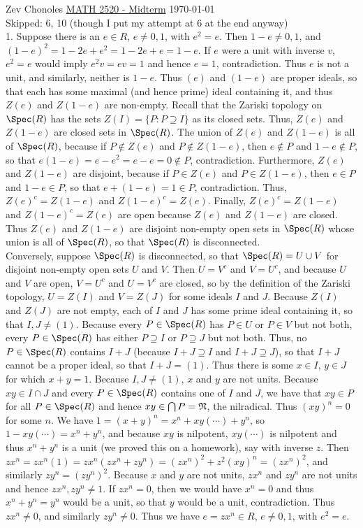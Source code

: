 \documentclass[11pt]{article}
\begin{document}
Zev Chonoles \hfill 
\underline{MATH 2520 - Midterm} \hfill \today\\

Skipped: 6, 10 (though I put my attempt at 6 at the end anyway)\\

\num{1.} Suppose there is an $e\in R$, $e\neq0,1$, with $e^2=e$. Then $1-e\neq0,1$, and $(1-e)^2=1-2e+e^2=1-2e+e=1-e$. If $e$ were a unit with inverse $v$, $e^2=e$ would imply $e^2v=ev=1$ and hence $e=1$, contradiction. Thus $e$ is not a unit, and similarly, neither is $1-e$. Thus $(e)$ and $(1-e)$ are proper ideals, so that each has some maximal (and hence prime) ideal containing it, and thus $Z(e)$ and $Z(1-e)$ are non-empty. Recall that the Zariski topology on $\Spec(R)$ has the sets $Z(I)=\{P:P\supseteq I\}$ as its closed sets. Thus, $Z(e)$ and $Z(1-e)$ are closed sets in $\Spec(R)$. The union of $Z(e)$ and $Z(1-e)$ is all of $\Spec(R)$, because if $P\notin Z(e)$ and $P\notin Z(1-e)$, then $e\notin P$ and $1-e\notin P$, so that $e(1-e)=e-e^2=e-e=0\notin P$, contradiction. Furthermore, $Z(e)$ and $Z(1-e)$ are disjoint, because if $P\in Z(e)$ and $P\in Z(1-e)$, then $e\in P$ and $1-e\in P$, so that $e+(1-e)=1\in P$, contradiction. Thus, $Z(e)^c=Z(1-e)$ and $Z(1-e)^c=Z(e)$. Finally, $Z(e)^c=Z(1-e)$ and $Z(1-e)^c=Z(e)$ are open because $Z(e)$ and $Z(1-e)$ are closed. Thus $Z(e)$ and $Z(1-e)$ are disjoint non-empty open sets in $\Spec(R)$ whose union is all of $\Spec(R)$, so that $\Spec(R)$ is disconnected.        \\

Conversely, suppose $\Spec(R)$ is disconnected, so that $\Spec(R)=U\cup V$ for disjoint non-empty open sets $U$ and $V$. Then $U=V^c$ and $V=U^c$, and because $U$ and $V$ are open, $V=U^c$ and $U=V^c$ are closed, so by the definition of the Zariski topology, $U=Z(I)$ and $V=Z(J)$ for some ideals $I$ and $J$. Because $Z(I)$ and $Z(J)$ are not empty, each of $I$ and $J$ has some prime ideal containing it, so that $I,J\neq(1)$. Because every $P\in\Spec(R)$ has $P\in U$ or $P\in V$ but not both, every $P\in\Spec(R)$ has either $P\supseteq I$ or $P\supseteq J$ but not both. Thus, no $P\in\Spec(R)$ contains $I+J$ (because $I+J\supseteq I$ and $I+J\supseteq J$), so that $I+J$ cannot be a proper ideal, so that $I+J=(1)$. Thus there is some $x\in I$, $y\in J$ for which $x+y=1$. Because $I,J\neq(1)$, $x$ and $y$ are not units. Because $xy\in I\cap J$ and every $P\in\Spec(R)$ contains one of $I$ and $J$, we have that $xy\in P$ for all $P\in\Spec(R)$ and hence $xy\in\bigcap P = \frak{N}$, the nilradical. Thus $(xy)^n=0$ for some $n$. We have $1=(x+y)^n=x^n+xy(\cdots)+y^n$, so $1-xy(\cdots)=x^n+y^n$, and because $xy$ is nilpotent, $xy(\cdots)$ is nilpotent and thus $x^n+y^n$ is a unit (we proved this on a homework), say with inverse $z$. Then $zx^n=zx^n(1)=zx^n(zx^n+zy^n)=(zx^n)^2+z^2(xy)^n=(zx^n)^2$, and similarly $zy^n=(zy^n)^2$. Because $x$ and $y$ are not units, $zx^n$ and $zy^n$ are not units and hence $zx^n,zy^n\neq1$. If $zx^n=0$, then we would have $x^n=0$ and thus $x^n+y^n=y^n$ would be a unit, so that $y$ would be a unit, contradiction. Thus $zx^n\neq0$, and similarly $zy^n\neq0$. Thus we have $e=zx^n\in R$, $e\neq0,1$, with $e^2=e$. \\
\end{document}
